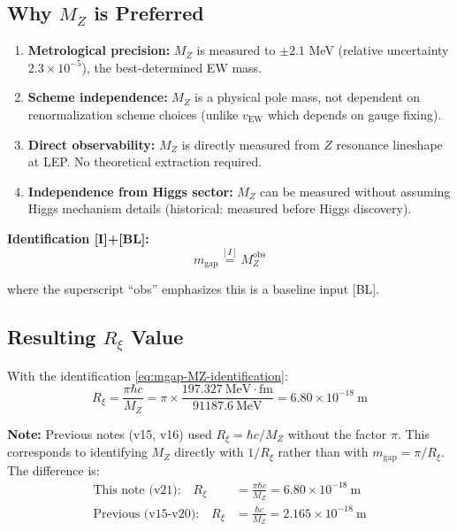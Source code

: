 \documentclass[11pt,a4paper]{article}
\newcommand{\Rxi}{R_\xi}
\newcommand{\MZ}{M_Z}
\newcommand{\vEW}{v_{\mathrm{EW}}}
\newcommand{\mgap}{m_{\mathrm{gap}}}
\begin{document}
\subsection{Why $\MZ$ is Preferred}

\begin{enumerate}
\item \textbf{Metrological precision:} $\MZ$ is measured to $\pm 2.1$ MeV
(relative uncertainty $2.3 \times 10^{-5}$), the best-determined EW mass.

\item \textbf{Scheme independence:} $\MZ$ is a physical pole mass, not dependent
on renormalization scheme choices (unlike $\vEW$ which depends on gauge fixing).

\item \textbf{Direct observability:} $\MZ$ is directly measured from $Z$ resonance
lineshape at LEP. No theoretical extraction required.

\item \textbf{Independence from Higgs sector:} $\MZ$ can be measured without
assuming Higgs mechanism details (historical: measured before Higgs discovery).
\end{enumerate}

\textbf{Identification [I]+[BL]:}
\begin{equation}
\mgap \stackrel{[I]}{=} \MZ^{\mathrm{obs}}
\label{eq:mgap-MZ-identification}
\end{equation}

where the superscript ``obs'' emphasizes this is a baseline input [BL].

\subsection{Resulting $\Rxi$ Value}

With the identification \eqref{eq:mgap-MZ-identification}:
\begin{equation}
\Rxi = \frac{\pi \hbar c}{\MZ} = \pi \times \frac{197.327~\mathrm{MeV \cdot fm}}{91187.6~\mathrm{MeV}}
= 6.80 \times 10^{-18}~\mathrm{m}
\label{eq:Rxi-numerical}
\end{equation}

\textbf{Note:} Previous notes (v15, v16) used $\Rxi = \hbar c/\MZ$ without the
factor $\pi$. This corresponds to identifying $\MZ$ directly with $1/\Rxi$ rather
than with $\mgap = \pi/\Rxi$. The difference is:
\begin{align}
\text{This note (v21):} \quad \Rxi &= \frac{\pi \hbar c}{\MZ} = 6.80 \times 10^{-18}~\mathrm{m}
\label{eq:Rxi-v21}\\
\text{Previous (v15-v20):} \quad \Rxi &= \frac{\hbar c}{\MZ} = 2.165 \times 10^{-18}~\mathrm{m}
\label{eq:Rxi-v15}
\end{align}
\end{document}

